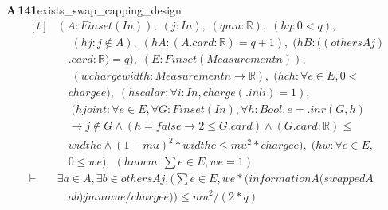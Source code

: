 \documentclass[conference]{IEEEtran}
\theoremstyle{definition}
\newcommand{\lean}[1]{\textsf{\footnotesize #1}}
\begin{document}
\noindent\textbf{A\,141}\quad\lean{exists\_swap\_capping\_design}
{\footnotesize\[ \begin{aligned}[t]
&(\mathit{A} : \mathit{Finset} (\mathit{I} \mathit{n})),\; (\mathit{j} : \mathit{I} \mathit{n}),\; (\mathit{q} \mathit{mu} : \mathbb{R} ),\; (\mathit{hq} : 0<\mathit{q}),\\
&\quad \; (\mathit{hj} : \mathit{j} \notin \mathit{A}),\; (\mathit{hA} : (\mathit{A}.\mathit{card}:\mathbb{R} )=\mathit{q}+1),\; (\mathit{hB} : ((\mathit{others} \mathit{A} \mathit{j})\\
&\quad .\mathit{card}:\mathbb{R} )=\mathit{q}),\; (\mathit{E} : \mathit{Finset} (\mathit{Measurement} \mathit{n})),\\
&\quad \; (\mathit{w} \mathit{charge} \mathit{width} : \mathit{Measurement} \mathit{n} \to \mathbb{R} ),\; (\mathit{hch} : \forall \mathit{e} \in \mathit{E}, 0 <\\
&\quad \mathit{charge} \mathit{e}),\; (\mathit{hscalar} : \forall \mathit{i} : \mathit{I} \mathit{n}, \mathit{charge} (.\mathit{inl} \mathit{i}) = 1),\\
&\quad \; (\mathit{hjoint} : \forall \mathit{e} \in \mathit{E}, \forall \mathit{G} : \mathit{Finset} (\mathit{I} \mathit{n}), \forall \mathit{h} : \mathit{Bool}, \mathit{e} = .\mathit{inr} (\mathit{G},\mathit{h})\\
&\quad \to \mathit{j} \notin \mathit{G} \wedge (\mathit{h}=\mathit{false} \to 2 \leq \mathit{G}.\mathit{card}) \wedge (\mathit{G}.\mathit{card}:\mathbb{R} ) \leq\\
&\quad \mathit{width} \mathit{e} \wedge (1-\mathit{mu})^{2}*\mathit{width} \mathit{e} \leq \mathit{mu}^{2}*\mathit{charge} \mathit{e}),\; (\mathit{hw} : \forall \mathit{e} \in \mathit{E},\\
&\quad 0 \leq \mathit{w} \mathit{e}),\; (\mathit{hnorm} : \textstyle\sum \mathit{e} \in \mathit{E}, \mathit{w} \mathit{e} = 1)\\
\vdash\;&\exists \mathit{a} \in \mathit{A}, \exists \mathit{b} \in \mathit{others} \mathit{A} \mathit{j}, (\textstyle\sum \mathit{e} \in \mathit{E}, \mathit{w} \mathit{e}*(\mathit{information} \mathit{A} (\mathit{swapped} \mathit{A}\\
&\quad \mathit{a} \mathit{b}) \mathit{j} \mathit{mu} \mathit{mu} \mathit{e}/\mathit{charge} \mathit{e})) \leq \mathit{mu}^{2}/(2*\mathit{q})
\end{aligned} \]}
\end{document}

